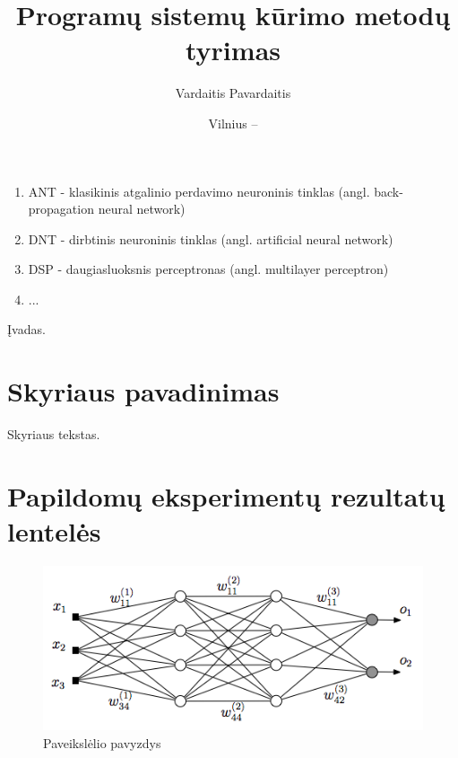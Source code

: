 \documentclass[12pt, a4paper, lithuanian]{article}
\title{Programų sistemų kūrimo metodų tyrimas}
\author{
   Vardaitis Pavardaitis 
}
\date{Vilnius – \the\year}
\begin{document}
\sloppy
\maketitle

\tableofcontents


\begin{enumerate}
\item ANT - klasikinis atgalinio perdavimo neuroninis tinklas (angl.
back-propagation neural network)
\item DNT - dirbtinis neuroninis tinklas (angl. artificial neural network)
\item DSP - daugiasluoksnis perceptronas (angl. multilayer perceptron)
\item ...
\end{enumerate}


Įvadas.


\section{Skyriaus pavadinimas}
Skyriaus tekstas. \cite{Banerjee1997}





\appendix
\section{Papildomų eksperimentų rezultatų lentelės}
\begin{figure}[H]
    \centering
    \includegraphics[scale=0.5]{img/MLP}
    \caption{Paveikslėlio pavyzdys}
    \label{img:mlp}
\end{figure}
\end{document}
